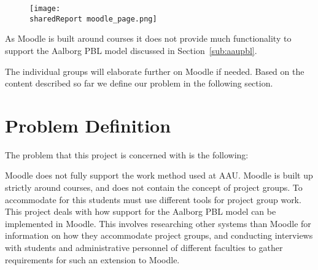 \begin{figure}
\texttt{[image: \\sharedReport moodle\_page.png]}
\label{fig:MoodleCourse}
\end{figure}

As Moodle is built around courses it does not provide much functionality to support the Aalborg PBL model discussed in Section~\ref{sub:aaupbl}.

The individual groups will elaborate further on Moodle if needed.
Based on the content described so far we define our problem in the following section.

\section{Problem Definition}
\label{sec:problemDef}
The problem that this project is concerned with is the following:

Moodle does not fully support the work method used at AAU.
Moodle is built up strictly around courses, and does not contain the concept of project groups.
To accommodate for this students must use different tools for project group work.
This project deals with how support for the Aalborg PBL model can be implemented in Moodle.
This involves researching other systems than Moodle for information on how they accommodate project groups, and conducting interviews with students and administrative personnel of different faculties to gather requirements for such an extension to Moodle.